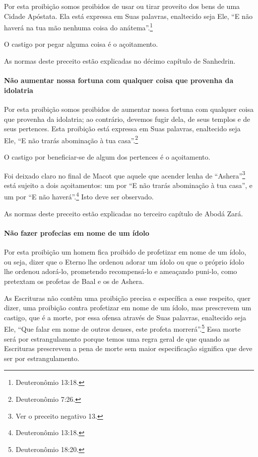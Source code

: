Por esta proibição somos proibidos de usar ou tirar proveito dos bens de
uma Cidade Apóstata. Ela está expressa em Suas palavras, enaltecido seja
Ele, ``E não haverá na tua mão nenhuma coisa do anátema''.\footnote{Deuteronômio
13:18.}

O castigo por pegar alguma coisa é o açoitamento.

As normas deste preceito estão explicadas no décimo capítulo de Sanhedrin.

\paragraph{Não aumentar nossa fortuna com qualquer coisa que provenha da idolatria}

Por esta proibição somos proibidos de aumentar nossa fortuna com
qualquer coisa que provenha da idolatria; ao contrário, devemos fugir
dela, de seus templos e de seus pertences. Esta proibição está expressa
em Suas palavras, enaltecido seja Ele, ``E não trarás abominação à tua casa''.\footnote{Deuteronômio 7:26.}

O castigo por beneficiar-se de algum dos pertences é o açoitamento.

Foi deixado claro no final de Macot que aquele que acender lenha de
``Ashera''\footnote{Ver o preceito negativo 13.} está sujeito a dois açoitamentos: um
por ``E não trarás abominação à tua casa'', e um por ``E não haverá''.\footnote{Deuteronômio 13:18.} Isto deve ser observado.

As normas deste preceito estão explicadas no terceiro capítulo de Abodá
Zará.

\paragraph{Não fazer profecias em nome de um ídolo}

Por esta proibição um homem fica proibido de profetizar em nome de um
ídolo, ou seja, dizer que o Eterno lhe ordenou adorar um ídolo ou que o
próprio ídolo lhe ordenou adorá-lo, prometendo recompensá-lo e
ameaçando puni-lo, como pretextam os profetas de Baal e os de Ashera.

As Escrituras não contêm uma proibição precisa e específica a esse
respeito, quer dizer, uma proibição contra profetizar em nome de um
ídolo, mas prescrevem um castigo, que é a morte, por essa ofensa através
de Suas palavras, enaltecido seja Ele, ``Que falar em nome de outros
deuses, este profeta morrerá''.\footnote{Deuteronômio 18:20.} Essa morte será por
estrangulamento porque temos uma regra geral de que quando as Escrituras
prescrevem a pena de morte sem maior especificação significa que deve
ser por estrangulamento.

